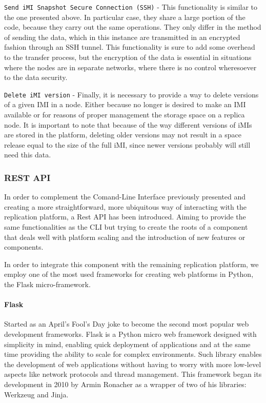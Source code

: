 \begin{description}
	\item \texttt{Send iMI Snapshot Secure Connection (SSH)} - This functionality is similar to the one presented above. In particular case, they share a large portion of the code, because they carry out the same operations. They only differ in the method of sending the data, which in this instance are transmitted in an encrypted fashion through an SSH tunnel. This functionality is sure to add some overhead to the transfer process, but the encryption of the data is essential in situations where the nodes are in separate networks, where there is no control wheresoever to the data security.
	\item \texttt{Delete iMI version} - Finally, it is necessary to provide a way to delete versions of a given IMI in a node. Either because no longer is desired to make an IMI available or for reasons of proper management the storage space on a replica node. It is important to note that because of the way different versions of iMIs are stored in the platform, deleting older versions may not result in a space release equal to the size of the full iMI, since newer versions probably will still need this data.
\end{description}


\subsubsection{REST API}
\label{subsub:impl_icbdrep_restapi}

In order to complement the Comand-Line Interface previously presented and creating a more straightforward, more ubiquitous way of interacting with the replication platform, a Rest API has been introduced. Aiming to provide the same functionalities as the CLI but trying to create the roots of a component that deals well with platform scaling and the introduction of new features or components.

In order to integrate this component with the remaining replication platform, we employ one of the most used frameworks for creating web platforms in Python, the Flask micro-framework.

\paragraph{Flask}
\label{par:impl_flask}

Started as an April's Fool's Day joke to become the second most popular web development frameworks. Flask is a Python micro web framework designed with simplicity in mind, enabling quick deployment of applications and at the same time providing the ability to scale for complex environments. Such library enables the development of web applications without having to worry with more low-level aspects like network protocols and thread management. This framework began its development in 2010 by Armin Ronacher as a wrapper of two of his libraries: Werkzeug and Jinja.

